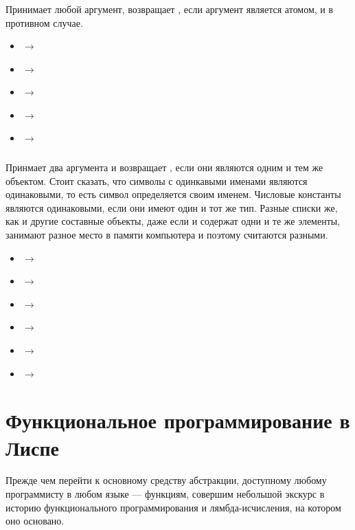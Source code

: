 \documentclass[a4paper, 12pt, titlepage, twoside]{article}
\newenvironment{examples}
               {\begin{itemize}\renewcommand{\labelitemi}{ }}
               {\end{itemize}}
\begin{document}
\subsubsection{}
Принимает любой аргумент, возвращает , если аргумент является атомом, и  в противном случае.
\begin{examples}
\item {} $\longrightarrow$ 
\item {} $\longrightarrow$ 
\item {} $\longrightarrow$ 
\item {} $\longrightarrow$ 
\item {} $\longrightarrow$ 
\end{examples}
\subsubsection{}
Принмает два аргумента и возвращает , если они являются одним и тем же объектом. Стоит сказать, что символы с одинкавыми именами являются одинаковыми, то есть символ определяется своим именем. Числовые константы являются одинаковыми, если они имеют один и тот же тип. Разные списки же, как и другие составные объекты, даже если и содержат одни и те же элементы, занимают разное место в памяти компьютера и поэтому считаются разными.
\begin{examples}
\item {} $\longrightarrow$ 
\item {} $\longrightarrow$ 
\item {} $\longrightarrow$ 
\item {} $\longrightarrow$ 
\item {} $\longrightarrow$ 
\item {} $\longrightarrow$ 
\end{examples}

\section{Функциональное программирование в Лиспе}
Прежде чем перейти к основному средству абстракции, доступному любому программисту в любом языке --- функциям, совершим небольшой экскурс в историю функционального программирования и лямбда-исчисления, на котором оно основано.
\end{document}
